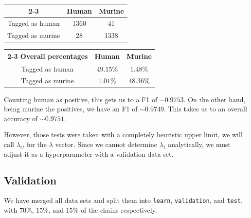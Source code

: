 \noindent\begin{minipage}{.45\textwidth}\setlength{\parindent}{15pt}
\begin{table}[H]
    \centering
    \renewcommand{\arraystretch}{1.5}
    \begin{tabular}{ccc} \cline{2-3}
        & Human & Murine \\ \hline
    Tagged as human    & 1360 & 41 \\ \hline
    Tagged as murine    & 28 & 1338 \\ \hline
    \end{tabular}
\end{table}
\end{minipage}\hfill\noindent\begin{minipage}{.45\textwidth}\setlength{\parindent}{15pt}
\begin{table}[H]
    \centering
    \renewcommand{\arraystretch}{1.5}
    \begin{tabular}{ccc} \cline{2-3}
    Overall percentages    & Human & Murine \\ \hline
    Tagged as human    & $49.15\%$ & $1.48\%$ \\ \hline
    Tagged as murine    & $1.01\%$ & $48.36\%$ \\ \hline
    \end{tabular}
\end{table}
\end{minipage}
\vspace\baselineskip

Counting human as positive, this gets us to a F1\futnotetext{} of $\sim 0.9753$\futnotetext{}. On the other hand, being murine the positives, we have an F1 of $\sim 0.9749$\futnotetext{}. This takes us to an overall accuracy\futnotetext{} of $\sim 0.9751$\futnotetext{}.

However, those tests were taken with a completely heuristic upper limit, we will call $\lambda_\text{t} $, for the $\lambda$ vector. Since we cannot determine $\lambda_\text{t} $ analytically, we must adjust it as a hyperparameter with a validation data set.

\newpage
\subsection{Validation}
We have merged all data sets and split them into \texttt{learn}, \texttt{validation}, and \texttt{test}, with $70\%$, $15\%$, and $15\%$ of the chains respectively.

